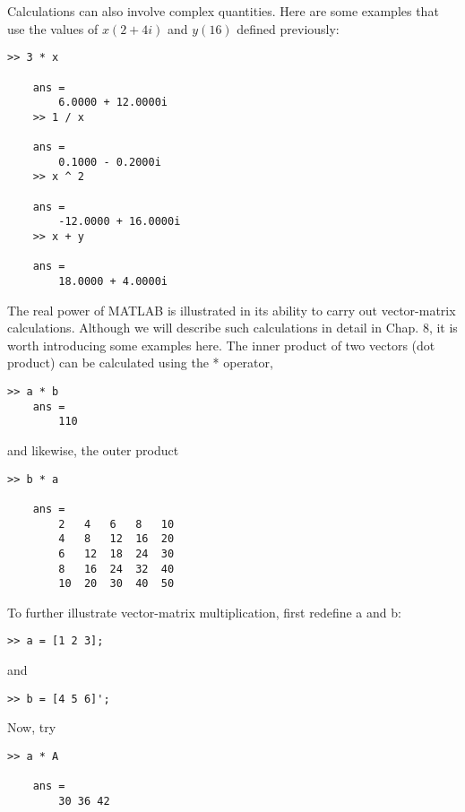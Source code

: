 \documentclass[../main.tex]{subfiles}
\begin{document}
Calculations can also involve complex quantities. Here are some examples that use the
values of $x (2 + 4i)$ and $y(16)$ defined previously:
\begin{lstlisting}[frame=none, numbers=none]
	>> 3 * x

	ans =
		6.0000 + 12.0000i
	>> 1 / x

	ans =
		0.1000 - 0.2000i
	>> x ^ 2

	ans =
		-12.0000 + 16.0000i
	>> x + y

	ans =
		18.0000 + 4.0000i
\end{lstlisting}
The real power of MATLAB is illustrated in its ability to carry out vector-matrix
calculations. Although we will describe such calculations in detail in Chap. 8, it is worth
introducing some examples here.
The inner product of two vectors (dot product) can be calculated using the * operator,
\begin{lstlisting}[frame=none, numbers=none]
	>> a * b
	ans =
		110
\end{lstlisting}
and likewise, the outer product
\begin{lstlisting}[frame=none, numbers=none]
	>> b * a

	ans =
		2 	4 	6 	8 	10
		4 	8 	12 	16 	20
		6 	12 	18 	24 	30
		8 	16 	24 	32 	40
		10 	20 	30 	40 	50
\end{lstlisting}
To further illustrate vector-matrix multiplication, first redefine a and b:
\begin{lstlisting}[frame=none, numbers=none]
	>> a = [1 2 3];
\end{lstlisting}
and
\begin{lstlisting}[frame=none, numbers=none]
	>> b = [4 5 6]';
\end{lstlisting}
Now, try
\begin{lstlisting}[frame=none, numbers=none]
	>> a * A

	ans =
		30 36 42
\end{lstlisting}
\end{document}
